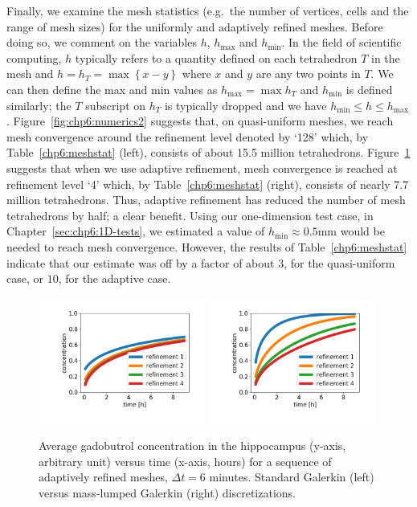 Finally, we examine the mesh statistics (e.g.~the number 
of vertices, cells and the range of mesh sizes) for the uniformly and 
adaptively refined meshes.  Before doing so, we comment on the variables 
$h$, $h_{\text{max}}$ and $h_{\text{min}}$.  In the field of scientific 
computing, $h$ typically refers to a quantity defined on each tetrahedron $T$ 
in the mesh and $h =h_T= \max\left\{x-y\right\}$ where $x$ and $y$ are any two 
points in $T$.  We can then define the max and min values as 
$h_{\text{max}} = \max{h_T}$ and $h_{\text{min}}$ is defined similarly; the 
$T$ subscript on $h_T$ is typically dropped and we have 
$h_{\text{min}} \leq h \leq h_{\text{max}}$.  Figure~\ref{fig:chp6:numerics2} 
suggests that, on quasi-uniform meshes, we reach mesh convergence around the 
refinement level denoted by `128' which, by Table~\ref{chp6:meshstat} (left), 
consists of about 15.5 million tetrahedrons.  Figure~\ref{fig:chp6:numerics3} 
suggests that when we use adaptive refinement, mesh convergence is reached at 
refinement level `4' which, by  Table~\ref{chp6:meshstat} (right), consists of 
nearly 7.7 million tetrahedrons.  Thus, adaptive refinement has reduced the 
number of mesh tetrahedrons by half; a clear benefit.  Using our one-dimension 
test case, in Chapter~\ref{sec:chp6:1D-tests}, we estimated a value of 
$h_\text{min}\approx 0.5\text{mm}$ would be needed to reach mesh convergence. 
However, the results of Table~\ref{chp6:meshstat} indicate that our estimate 
was off by a factor of about $3$, for the quasi-uniform case, or $10$, for the 
adaptive case.  
\begin{figure}	
\includegraphics[width=0.49\textwidth]{./graphics/chp6/tracer_hippocampus_notlumped_addaptive.png}
\includegraphics[width=0.49\textwidth]{./graphics/chp6/tracer_hippocampus_lumped_addaptive.png}
  \caption{Average gadobutrol concentration in the hippocampus
    (y-axis, arbitrary unit) versus time (x-axis, hours) for a
    sequence of adaptively refined meshes, $\Delta t = 6$
    minutes. Standard Galerkin (left) versus mass-lumped Galerkin (right)
    discretizations.}
\label{fig:chp6:numerics3}
\end{figure}

